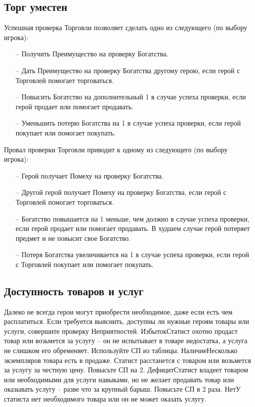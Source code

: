 \subsection{Торг уместен}
Успешная проверка Торговли позволяет сделать одно из следующего (по выбору игрока):
\begin{itemize}
\item[--] Получить Преимущество на проверку Богатства.
\item[--] Дать Преимущество на проверку Богатства другому герою, если герой с Торговлей помогает торговаться.
\item[--] Повысить Богатство на дополнительный 1 в случае успеха проверки, если герой продает или помогает продавать.
\item[--] Уменьшить потерю Богатства на 1 в случае успеха проверки, если герой покупает или помогает покупать.
\end{itemize}
Провал проверки Торговли приводит к одному из следующего (по выбору игрока):
\begin{itemize}
\item[--] Герой получает Помеху на проверку Богатства.
\item[--] Другой герой получает Помеху на проверку Богатства, если герой с Торговлей помогает торговаться.
\item[--] Богатство повышается на 1 меньше, чем должно в случае успеха проверки, если герой продает или помогает продавать. В худшем случае герой потеряет предмет и не повысит свое Богатство.
\item[--] Потеря Богатства увеличивается на 1 в случае успеха проверки, если герой с Торговлей покупает или помогает покупать.
\end{itemize}

\subsection{Доступность товаров и услуг}
Далеко не всегда герои могут приобрести необходимое, даже если есть чем расплатиться. Если требуется выяснить, доступны ли нужные героям товары или услуги, совершите проверку Неприятностей.
\trouble
{Избыток}{Статист охотно продаст товар или возьмется за услугу – он не испытывает в товаре недостатка, а услуга не слишком его обременяет. Используйте СП из таблицы.}
{Наличие}{Несколько экземпляров товара есть в продаже. Статист расстанется с товаром или возьмется за услугу за честную цену. Повысьте СП на 2.}
{Дефицит}{Статист владеет товаром или необходимыми для услуги навыками, но не желает продавать товар или оказывать услугу – разве что за крупный барыш. Повысьте СП в 2 раза.}
{Нет}{У статиста нет необходимого товара или он не может оказать услугу.}
